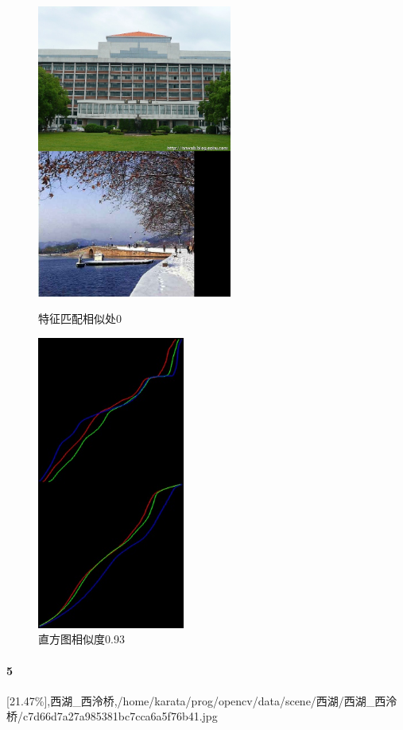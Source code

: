 \begin{figure}[htb]
\begin{minipage}[t]{0.5\linewidth}
\centering
\includegraphics[height=3.8in]{玉泉图书馆.jpg.d/im4sift.jpg}
\caption{特征匹配相似处0}
\label{fig:side:a}
\end{minipage}%
\begin{minipage}[t]{0.5\linewidth}
\centering
\includegraphics[height=3.8in]{玉泉图书馆.jpg.d/im4hist2.jpg}
\caption{直方图相似度0.93}
\label{fig:side:a}
\end{minipage}%
\end{figure}

\paragraph{5}
[21.47\%],西湖_西泠桥,/home/karata/prog/opencv/data/scene/西湖/西湖_西泠桥/c7d66d7a27a985381bc7cca6a5f76b41.jpg

